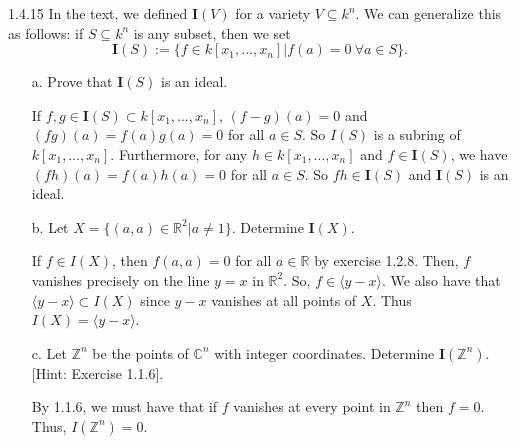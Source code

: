 \documentclass[12pt]{article}
\newcommand{\is}{\mathbf{I}(S)}
\begin{document}
1.4.15
In the text, we defined $\mathbf{I}(V)$ for a variety $V\subseteq k^n$. We can generalize this as follows: if $S\subseteq k^n$ is any subset, then we set $$\mathbf{I}(S):=\{f\in k[x_1,\ldots, x_n] \vert f(a)=0 \ \forall a\in S\}.$$
\begin{enumerate}
    \item[a.] Prove that $\mathbf{I}(S)$ is an ideal.
    \begin{mybox}
        If $f,g\in \is\subset k[x_1,\ldots,x_n]$, $(f-g)(a)=0$ and
        $(fg)(a)=f(a)g(a)=0$ for all $a\in S$. So $I(S)$ is
        a subring of $k[x_1,\ldots,x_n]$. Furthermore, for any $h\in
        k[x_1,\ldots,x_n]$ and $f\in\is$, we have $(fh)(a)=f(a)h(a)=0$
        for all $a\in S$. So $fh\in\is$ and $\is$ is an ideal.
    \end{mybox}
    \item[b.] Let $X=\{(a,a)\in \mathbb{R}^2 \vert a\neq 1\}$. Determine $\mathbf{I}(X).$
    \begin{mybox}
        If $f\in I(X)$, then $f(a,a)=0$ for all $a\in
        \mathbb{R}$ by exercise 1.2.8. Then, $f$ vanishes
        precisely on the line $y=x$ in $\mathbb{R}^2$.
        So, $f\in\langle y-x\rangle$. We also have that
        $\langle y-x\rangle\subset I(X)$ since $y-x$ vanishes
        at all points of $X$. Thus $I(X)=\langle y-x\rangle$.
    \end{mybox}
    \item[c.] Let $\mathbb{Z}^n$ be the points of $\mathbb{C}^n$ with integer coordinates. Determine $\mathbf{I}(\mathbb{Z}^n)$. [Hint: Exercise 1.1.6].
    \begin{mybox}
        By 1.1.6, we must have that if $f$ vanishes at every
        point in $\mathbb{Z}^n$ then $f=0$. Thus,
        $I(\mathbb{Z}^n)=0$.
    \end{mybox}
\end{enumerate}
\end{document}
